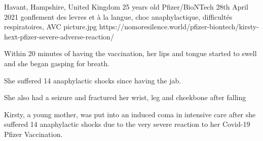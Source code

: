           {Havant, Hampshire, United Kingdom}
          {25 years old}
          {Pfizer/BioNTech}
          {28th April 2021}
          {
            gonflement des levres et à la langue,
            choc anaphylactique,
            difficultés respiratoires,
            AVC
          }
          {picture.jpg}
          {https://nomoresilence.world/pfizer-biontech/kirsty-hext-pfizer-severe-adverse-reaction/}
          {

Within 20 minutes of having the vaccination, her lips and tongue started to
swell and she began gasping for breath.

She suffered 14 anaphylactic shocks since having the jab.

She also had a seizure and fractured her wrist, leg and cheekbone after falling

Kirsty, a young mother, was put into an induced coma in intensive care after she
suffered 14 anaphylactic shocks due to the very severe reaction to her Covid-19
Pfizer Vaccination.

}
